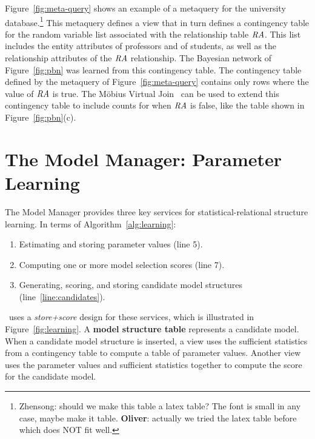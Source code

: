 Figure~\ref{fig:meta-query} shows an example of a metaquery for the university database.\footnote{Zhensong: should we make this table a latex table? The font is small in any case, maybe make it table. \textbf{Oliver}: actually we tried the latex table before which does NOT fit well.
} This metaquery defines a view that in turn defines a contingency table for the random variable list associated with the relationship table $\mathit{RA}$. This list includes the entity attributes of professors and of students, as well as the relationship attributes of the $\mathit{RA}$ relationship. 
The Bayesian network of Figure~\ref{fig:pbn} was learned from this contingency table. 
The  contingency table defined by the metaquery of Figure~\ref{fig:meta-query} contains only rows where the value of $\mathit{RA}$ is true. The M\"obius Virtual Join~\cite{Qian2014a} can be used to extend this contingency table to include counts for when $\mathit{RA}$ is false, like the table shown in Figure~\ref{fig:pbn}(c).

\section{The Model Manager: Parameter Learning} \label{sec:model-manager}

The Model Manager provides three key services for statistical-relational structure learning. In terms of Algorithm~\ref{alg:learning}: 

\begin{enumerate}
\item  Estimating and storing parameter values (line 5).
\item Computing one or more model selection scores (line 7).
\item Generating, scoring, and storing candidate model structures (line~\ref{line:candidates}).
\end{enumerate}

\FB\ uses a {\em store+score} design for these services, which is illustrated in 
Figure~\ref{fig:learning}. 
A \textbf{model structure table} represents a candidate model. When a candidate model structure is inserted, a view uses the sufficient statistics from a contingency table to compute a table of parameter values. Another view uses the parameter values and sufficient statistics together to compute the score for the candidate model. 

